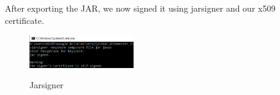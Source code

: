 \noindent After exporting the JAR, we now signed it using jarsigner and our x509 certificate.

\newpage
\begin{figure}[hbt!]
	\centering
      \includegraphics[width=0.4\textwidth]{imgs/jarsign/sign_applet_jar} \\
	\caption{Jarsigner}
	\label{fig:specifiyingkeysize}
    \noindent\makebox[\linewidth]{}
\end{figure}

